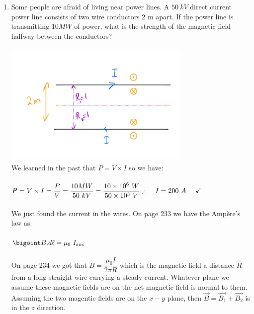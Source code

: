 \documentclass[fleqn]{article}
\begin{document}
  \begin{enumerate}
    \item Some people are afraid of living near power lines.  A $50 ~ kV$ direct current power line consists of two wire conductors 2 m apart. If the
    power line is transmitting $10 MW$ of power, what is the strength of the
    magnetic field halfway between the conductors?

      \textcolor{hwColor}{
        \includegraphics[height=6cm, width=9cm]{1.JPG}
        \\
        We learned in the past that $P=V \times I$ so we have:
        \\
        \\
        $
          P=V \times I=\dfrac{P}{V}=\dfrac{10 MW}{50 ~ kV}=\dfrac{10 \times 10^6 ~ W}{50 \times 10^3 ~ V}
          \\
          \\
          \\
          \therefore ~~~ I=200 ~ A ~~~~ \checkmark
        $
        \\
        \\
        We just found the current in the wires. On page 233 we have the Ampère's law as:
        \\
        \\
        $
          \bigoint B.d\ell=\mu_0 ~ I_{enc}
        $
        \\
        \\
        On page 234 we got that $B=\dfrac{\mu_0 I}{2 \pi R}$ which is the magnetic field a distance $R$ from a 
        long straight wire carrying a steady current. Whatever plane we assume these magnetic fields are on the 
        net magnetic field is normal to them. Assuming the two magentic fields are on the $x-y$ plane, then 
        $\overrightarrow{B}=\overrightarrow{B_1}+\overrightarrow{B_2}$ is in the $z$ direction.
        \\
        \\
}
\end{enumerate}
\end{document}

